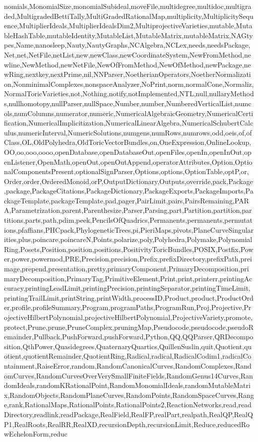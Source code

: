 {nomials,MonomialSize,monomialSubideal,moveFile,multidegree,multidoc,multigraded,MultigradedBettiTally,MultiGradedRationalMap,multiplicity,MultiplicitySequence,MultiplierIdeals,MultiplierIdealsDim2,MultiprojectiveVarieties,mutable,MutableHashTable,mutableIdentity,MutableList,MutableMatrix,mutableMatrix,NAGtypes,Name,nanosleep,Nauty,NautyGraphs,NCAlgebra,NCLex,needs,needsPackage,Net,net,NetFile,netList,new,newClass,newCoordinateSystem,NewFromMethod,newline,NewMethod,newNetFile,NewOfFromMethod,NewOfMethod,newPackage,newRing,nextkey,nextPrime,nil,NNParser,NoetherianOperators,NoetherNormalization,NonminimalComplexes,nonspaceAnalyzer,NoPrint,norm,normalCone,Normaliz,NormalToricVarieties,not,Nothing,notify,notImplemented,NTL,null,nullaryMethods,nullhomotopy,nullParser,nullSpace,Number,number,NumberedVerticalList,numcols,numColumns,numerator,numeric,NumericalAlgebraicGeometry,NumericalCertification,NumericalImplicitization,NumericalLinearAlgebra,NumericalSchubertCalculus,numericInterval,NumericSolutions,numgens,numRows,numrows,odd,oeis,of,ofClass,OL,OldPolyhedra,OldToricVectorBundles,on,OneExpression,OnlineLookup,OO,oo,ooo,oooo,openDatabase,openDatabaseOut,openFiles,openIn,openInOut,openListener,OpenMath,openOut,openOutAppend,operatorAttributes,Option,OptionalComponentsPresent,optionalSignParser,Options,options,OptionTable,optP,or,Order,order,OrderedMonoid,orP,OutputDictionary,Outputs,override,pack,Package,package,PackageCitations,PackageDictionary,PackageExports,PackageImports,PackageTemplate,packageTemplate,pad,pager,PairLimit,pairs,PairsRemaining,PARA,Parametrization,parent,Parenthesize,Parser,Parsing,part,Partition,partition,partitions,parts,path,pdim,peek,PencilsOfQuadrics,Permanents,permanents,permutations,pfaffians,PHCpack,PhylogeneticTrees,pi,PieriMaps,pivots,PlaneCurveSingularities,plus,poincare,poincareN,Points,polarize,poly,Polyhedra,Polymake,PolynomialRing,Posets,Position,position,positions,PositivityToricBundles,POSIX,Postfix,Power,power,powermod,PRE,Precision,precision,Prefix,prefixDirectory,prefixPath,preimage,prepend,presentation,pretty,primaryComponent,PrimaryDecomposition,primaryDecomposition,PrimaryTag,PrimitiveElement,Print,print,printerr,printingAccuracy,printingLeadLimit,printingPrecision,printingSeparator,printingTimeLimit,printingTrailLimit,printString,printWidth,processID,Product,product,ProductOrder,profile,profileSummary,Program,programPaths,ProgramRun,Proj,Projective,ProjectiveHilbertPolynomial,projectiveHilbertPolynomial,ProjectiveVariety,promote,protect,Prune,prune,PruneComplex,pruningMap,Pseudocode,pseudocode,pseudoRemainder,Pullback,PushForward,pushForward,Python,QQ,QQParser,QRDecomposition,QthPower,Quasidegrees,QuaternaryQuartics,QuillenSuslin,quit,Quotient,quotient,quotientRemainder,QuotientRing,Radical,radical,RadicalCodim1,radicalContainment,RaiseError,random,RandomCanonicalCurves,RandomComplexes,RandomCurves,RandomCurvesOverVerySmallFiniteFields,RandomGenus14Curves,RandomIdeals,randomKRationalPoint,RandomMonomialIdeals,randomMutableMatrix,RandomObjects,RandomPlaneCurves,RandomPoints,RandomSpaceCurves,Range,rank,RationalMaps,RationalPoints,RationalPoints2,ReactionNetworks,read,readDirectory,readlink,readPackage,RealField,RealFP,realPart,realpath,RealQP,RealQP1,RealRoots,RealRR,RealXD,recursionDepth,recursionLimit,Reduce,reducedRowEchelonForm,reduc}
